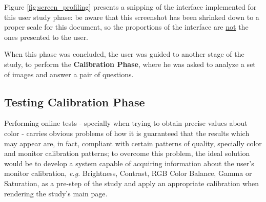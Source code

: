 %
Figure \ref{fig:screen_profiling} presents a snipping of the interface implemented for this user
study phase: be aware that this screenshot has been shrinked down to a proper scale for this document, so the proportions of the interface
are \ul{not} the ones presented to the user. \par
%
When this phase was concluded, the user was guided to another stage of the study, to perform the \textbf{Calibration Phase}, where
he was asked to analyze a set of images and answer a pair of questions. \par
%
%
\subsection{Testing Calibration Phase}
\label{subsec:design_calibration}
%
Performing online tests - specially when trying to obtain precise values about color - carries obvious problems of how it is guaranteed that
the results which may appear are, in fact, compliant with certain patterns of quality, specially color and monitor calibration patterns; to
overcome this problem, the ideal solution would be to develop a system capable of acquiring information about the user's monitor calibration,
\emph{e.g.} Brightness, Contrast, RGB Color Balance, Gamma or Saturation, as a pre-step of the study and apply an appropriate calibration when
rendering the study's main page. \par
%
